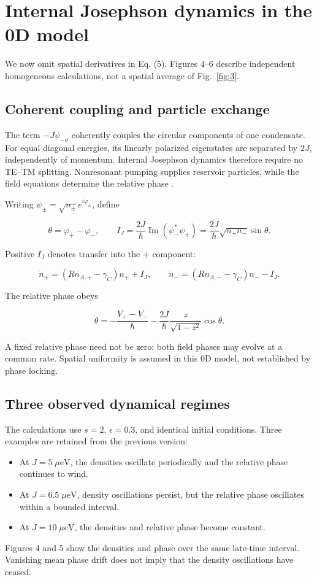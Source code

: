 \documentclass[12pt,a4paper]{article}
\begin{document}
\section{Internal Josephson dynamics in the 0D model}

We now omit spatial derivatives in Eq. (5). Figures 4--6 describe independent homogeneous calculations, not a spatial average of Fig.~\ref{fig:3}.

\subsection{Coherent coupling and particle exchange}

The term \(-J\psi_{-\sigma}\) coherently couples the circular components of one condensate. For equal diagonal energies, its linearly polarized eigenstates are separated by \(2J\), independently of momentum. Internal Josephson dynamics therefore require no TE--TM splitting. Nonresonant pumping supplies reservoir particles, while the field equations determine the relative phase \cite{ref4}.

Writing \(\psi_\pm=\sqrt{n_\pm}e^{i\varphi_\pm}\), define

\[
\theta=\varphi_+-\varphi_-,\qquad
I_J=\frac{2J}{\hbar}\operatorname{Im}(\psi_-^*\psi_+)
=\frac{2J}{\hbar}\sqrt{n_+n_-}\sin\theta.
\tag{11}\label{eq:11}
\]

Positive \(I_J\) denotes transfer into the + component:

\[
\dot n_+=(Rn_{A,+}-\gamma_C)n_++I_J,\qquad
\dot n_-=(Rn_{A,-}-\gamma_C)n_--I_J.
\tag{12}\label{eq:12}
\]

The relative phase obeys

\[
\dot\theta=-\frac{V_+-V_-}{\hbar}
-\frac{2J}{\hbar}\frac{z}{\sqrt{1-z^2}}\cos\theta.
\tag{13}\label{eq:13}
\]

A fixed relative phase need not be zero: both field phases may evolve at a common rate. Spatial uniformity is assumed in this 0D model, not established by phase locking.

\subsection{Three observed dynamical regimes}

The calculations use \(s=2\), \(\epsilon=0.3\), and identical initial conditions. Three examples are retained from the previous version:

\begin{itemize}
\item At \(J=5\;\mu\mathrm{eV}\), the densities oscillate periodically and the relative phase continues to wind.
\item At \(J=6.5\;\mu\mathrm{eV}\), density oscillations persist, but the relative phase oscillates within a bounded interval.
\item At \(J=10\;\mu\mathrm{eV}\), the densities and relative phase become constant.

\end{itemize}
Figures 4 and 5 show the densities and phase over the same late-time interval. Vanishing mean phase drift does not imply that the density oscillations have ceased.
\end{document}

